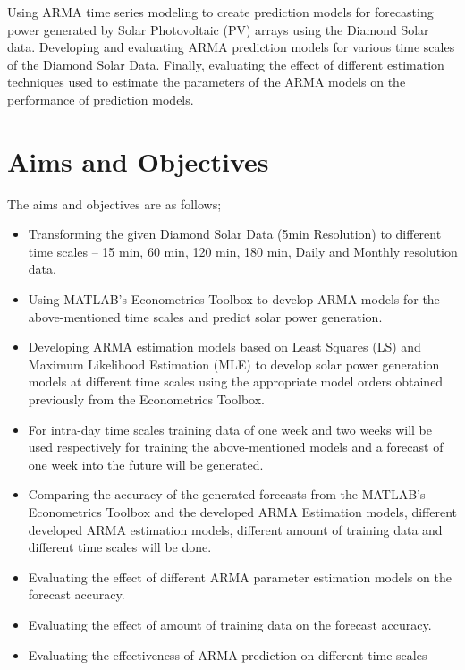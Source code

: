 \documentclass[journal]{IEEEtran}
\begin{document}
Using ARMA time series modeling to create prediction models for forecasting power generated by Solar Photovoltaic (PV) arrays using the Diamond Solar data. Developing and evaluating ARMA prediction models for various time scales of the Diamond Solar Data. Finally, evaluating the effect of different estimation techniques used to estimate the parameters of the ARMA models on the performance of prediction models.


\section{Aims and Objectives}

The aims and objectives are as follows;



\begin{itemize}
  \item Transforming the given Diamond Solar Data (5min Resolution) to different time scales – 15 min, 60 min, 120 min, 180 min, Daily and Monthly resolution data.
  \item Using MATLAB’s Econometrics Toolbox to develop ARMA models for the above-mentioned time scales and predict solar power generation.

  \item Developing ARMA estimation models based on Least Squares (LS) and Maximum Likelihood Estimation (MLE) to develop solar power generation models at different time scales using the appropriate model orders obtained previously from the Econometrics Toolbox.
  \item For intra-day time scales training data of one week and two weeks will be used respectively for training the above-mentioned models and a forecast of one week into the future will be generated. 
  \item Comparing the accuracy of the generated forecasts from the MATLAB’s Econometrics Toolbox and the developed ARMA Estimation models, different developed ARMA estimation models, different amount of training data and different time scales will be done.
  \item Evaluating the effect of different ARMA parameter estimation models on the forecast accuracy.
  \item Evaluating the effect of amount of training data on the forecast accuracy.
  \item Evaluating the effectiveness of ARMA prediction on different time scales
  
   
\end{itemize}
\end{document}
